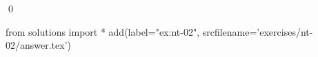 
\begin{ex} 
  \label{ex:nt-02}
  
  \qed
\end{ex} 
\begin{python0}
from solutions import *
add(label="ex:nt-02",
    srcfilename='exercises/nt-02/answer.tex') 
\end{python0}
